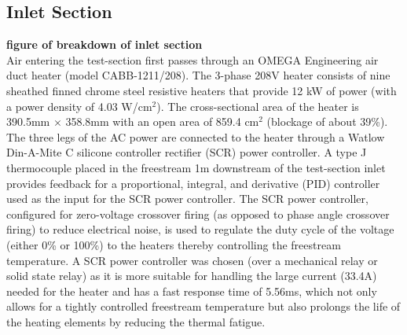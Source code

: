 \subsection{Inlet Section}
{\bf figure of breakdown of inlet section}\\

Air entering the test-section first passes through an OMEGA Engineering air duct heater (model CABB-1211/208). 
The 3-phase 208V heater consists of nine sheathed finned chrome steel resistive heaters that provide 12 kW of power (with a power density of 4.03 W/cm$^2$). 
The cross-sectional area of the heater is 390.5mm $\times$ 358.8mm with an open area of 859.4 cm$^2$ (blockage of about 39\%). 
The three legs of the AC power are connected to the heater through a Watlow Din-A-Mite C silicone controller rectifier (SCR) power controller. 
A type J thermocouple placed in the freestream 1m downstream of the test-section inlet provides feedback for a proportional, integral, and derivative (PID) controller used as the input for the SCR power controller. 
The SCR power controller, configured for zero-voltage crossover firing (as opposed to phase angle crossover firing) to reduce electrical noise, is used to regulate the duty cycle of the voltage (either 0\% or 100\%) to the heaters thereby controlling the freestream temperature. 
A SCR power controller was chosen (over a mechanical relay or solid state relay) as it is more suitable for handling the large current (33.4A) needed for the heater and has a fast response time of 5.56ms, which not only allows for a tightly controlled freestream temperature but also prolongs the life of the heating elements by reducing the thermal fatigue.


